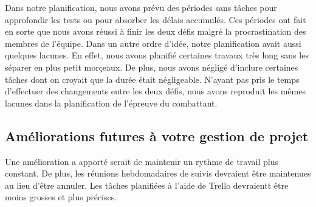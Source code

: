 \begin{spacing}{1.5}
    Dans notre planification, nous avons prévu des périodes sans tâches pour approfondir les tests ou pour absorber les délais accumulés.
    Ces périodes ont fait en sorte que nous avons réussi à finir les deux défis malgré la procrastination des membres de l'équipe.
    Dans un autre ordre d'idée, notre planification avait aussi quelques lacunes. En effet, nous avons planifié certaines travaux très long sans les séparer en plus petit morçeaux.
    De plus, nous avons négligé d'inclure certaines tâches dont on croyait que la durée était négligeable.
    N'ayant pas pris le temps d'effectuer des changements entre les deux défis, nous avons reproduit les mêmes lacunes dans la planification de l'épreuve du combattant.
\end{spacing}

\subsection{Améliorations futures à votre gestion de projet}

\begin{spacing}{1.5}
    Une amélioration a apporté serait de maintenir un rythme de travail plus constant.
    De plus, les réunions hebdomadaires de suivis devraient être maintenues au lieu d'être annuler.
    Les tâches planifiées à l'aide de Trello devraientt être moins grosses et plus précises.
\end{spacing}
